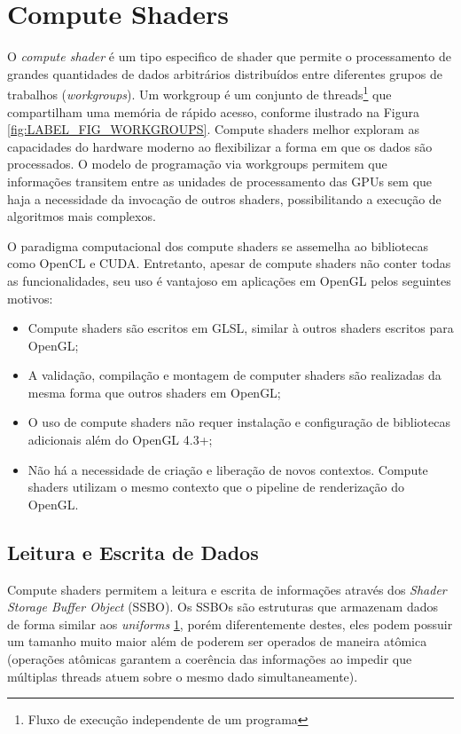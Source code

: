 \section{Compute Shaders}\label{sec:LABEL_CHP_1_SEC_C}

O \textit{compute shader} é um tipo especifico de shader que permite o processamento de grandes quantidades de dados arbitrários distribuídos entre diferentes grupos de trabalhos (\textit{workgroups}). Um workgroup é um conjunto de threads\footnote{Fluxo de execução independente de um programa} que compartilham uma memória de rápido acesso, conforme ilustrado na Figura \ref{fig:LABEL_FIG_WORKGROUPS}. Compute shaders melhor exploram as capacidades do hardware moderno ao flexibilizar a forma em que os dados são processados. O modelo de programação via workgroups permitem que informações transitem entre as unidades de processamento das GPUs sem que haja a necessidade da invocação de outros shaders, possibilitando a execução de algoritmos mais complexos. 

O paradigma computacional dos compute shaders se assemelha ao bibliotecas como OpenCL e CUDA. Entretanto, apesar de compute shaders não conter todas as funcionalidades, seu uso é vantajoso em aplicações em OpenGL pelos seguintes motivos:

\begin{itemize}
  \item Compute shaders são escritos em GLSL, similar à outros shaders escritos para OpenGL;
  \item A validação, compilação e montagem de computer shaders são realizadas da mesma forma que outros shaders em OpenGL;
  \item O uso de compute shaders não requer instalação e configuração de bibliotecas adicionais além do OpenGL 4.3+;
  \item Não há a necessidade de criação e liberação de novos contextos. Compute shaders utilizam o mesmo contexto que o pipeline de renderização do OpenGL.
\end{itemize}

\subsection{Leitura e Escrita de Dados}\label{sec:LAVEL_CHP_1_SEC_D}

Compute shaders permitem a leitura e escrita de informações através dos \textit{Shader Storage Buffer Object} (SSBO). Os SSBOs são estruturas que armazenam dados de forma similar aos \textit{uniforms} \ref{sec:LABEL_CHP_1_SEC_C}, porém diferentemente destes, eles podem possuir um tamanho muito maior além de poderem ser operados de maneira atômica (operações atômicas garantem a coerência das informações ao impedir que múltiplas threads atuem sobre o mesmo dado simultaneamente).

